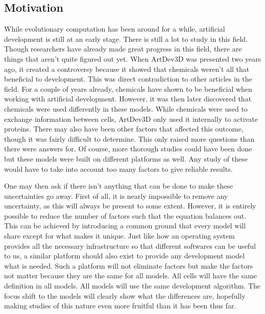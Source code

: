 \subsection{Motivation}
While evolutionary computation has been around for a while, artificial development is still at an early stage. There is still a lot to study in this field. Though researchers have already made great progress in this field, there are things that aren't quite figured out yet. When ArtDev3D was presented two years ago, it created a controversy because it showed that chemicals weren't all that beneficial to development. This was direct contradiction to other articles in the field. For a couple of years already, chemicals have shown to be beneficial when working with artificial development. However, it was then later discovered that chemicals were used differently in these models. While chemicals were used to exchange information between cells, ArtDev3D only used it internally to activate proteins. There may also have been other factors that affected this outcome, though it was fairly difficult to determine. This only raised more questions than there were answers for. Of course, more thorough studies could have been done but these models were built on different platforms as well. Any study of these would have to take into account too many factors to give reliable results.

One may then ask if there isn't anything that can be done to make these uncertainties go away. First of all, it is nearly impossible to remove any uncertainty, as this will always be present to some extent. However, it is entirely possible to reduce the number of factors such that the equation balances out. This can be achieved by introducing a common ground that every model will share except for what makes it unique. Just like how an operating system provides all the necessary infrastructure so that different softwares can be useful to us, a similar platform should also exist to provide any development model what is needed. Such a platform will not eliminate factors but make the factors not matter because they are the same for all models. All cells will have the same definition in all models. All models will use the same development algorithm. The focus shift to the models will clearly show what the differences are, hopefully making studies of this nature even more fruitful than it has been thus far.

